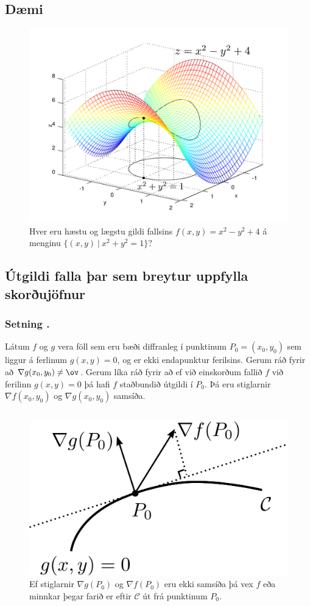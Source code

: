 \subsection{Dæmi}
 \begin {figure}[h!]
 \centering
            \includegraphics[width=.7\linewidth]{constraint.pdf}
            \caption*{Hver eru hæstu og lægstu gildi fallsins $f(x,y) = x^2-y^2+4$ á menginu $\{(x,y)~|~x^2+y^2=1\}$?}
\end {figure}




 


\subsection{Útgildi falla þar sem breytur uppfylla skorðujöfnur} 

\subsubsection{Setning \kaflanr.}
Látum $f$ og $g$ vera föll sem eru bæði
diffranleg í punktinum $P_0=(x_0,y_0)$ sem liggur á ferlinum
$g(x,y)=0$, og er ekki endapunktur ferilsins.  Gerum ráð fyrir að
$\nabla g(x_0,y_0)\neq \ov$.  Gerum líka ráð fyrir að ef við einskorðum fallið $f$ við ferilinn $g(x,y)=0$ þá hafi $f$ staðbundið útgildi í $P_0$.  Þá eru stiglarnir $\nabla f(x_0,y_0)$ og $\nabla g(x_0,y_0)$ samsíða.


\subsection{}
\begin {figure}[h!]
 \centering
            \includegraphics[width=.4\linewidth]{lagrange1}
            \caption*{Ef stiglarnir $\nabla g(P_0)$ og $\nabla f(P_0)$ eru ekki samsíða þá vex $f$ eða minnkar þegar farið er eftir $\mathcal{C}$ út frá punktinum $P_0$.}
\end {figure}



